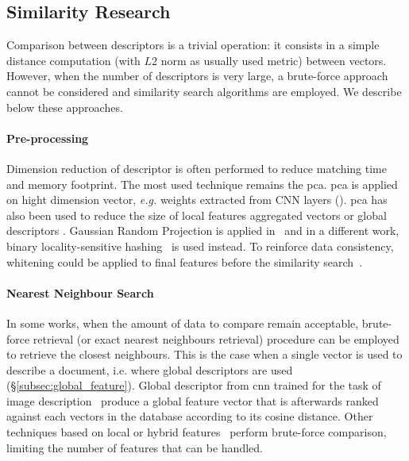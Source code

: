 	\subsection{Similarity Research}
	\label{subsec:similarity_research}

	    Comparison between descriptors is a trivial operation: it consists in a simple distance computation (with $L2$ norm as usually used metric) between vectors. However, when the number of descriptors is very large, a brute-force approach cannot be considered and similarity search algorithms are employed. We describe below these approaches.
	    
		\paragraph{Pre-processing}
        	Dimension reduction of descriptor is often performed to reduce matching time and memory footprint. The most used technique remains the \ac{pca}. \ac{pca} is applied on hight dimension vector, \textit{e.g.} weights extracted from CNN layers (\citep{Arandjelovic2017,Gordo2016}). \ac{pca} has also been used to reduce the size of local features aggregated vectors \citep{Kim2015,Torii2015} or global descriptors \citep{Ni2009}. Gaussian Random Projection is applied in~\citep{Sunderhauf2015a,Panphattarasap2016} and in a different work, binary locality-sensitive hashing~\citep{Sunderhauf2015} is used instead. To reinforce data consistency, whitening could be applied to final features before the similarity search~\citep{Jegou2012a,Gong2014,Tolias2016,Arandjelovic2017,Gordo2016,Radenovic2016}.

		\paragraph{Nearest Neighbour Search}


			In some works, when the amount of data to compare remain acceptable, brute-force retrieval (or exact nearest neighbours retrieval) procedure can be employed to retrieve the closest neighbours. This is the case when a single vector is used to describe a document, i.e. where global descriptors are used (\S\ref{subsec:global_feature}). Global descriptor from \ac{cnn} trained for the task of image description~\citep{Babenko2014,Sunderhauf2015,Radenovic2016,Gordo2016,Arandjelovic2017} produce a global feature vector that is afterwards ranked against each vectors in the database according to its cosine distance. Other techniques based on local or hybrid features~\citep{Zamir2010,Zamir2014,Sunderhauf2015a} perform brute-force comparison, limiting the number of features that can be handled.

